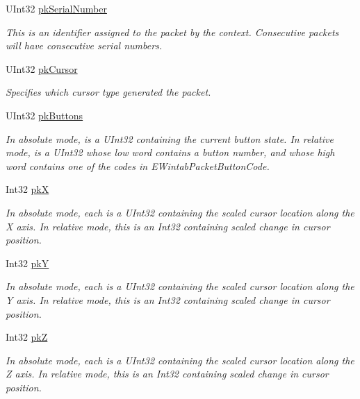 \begin{DoxyCompactItemize}
U\+Int32 \mbox{\hyperlink{struct_wintab_d_n_1_1_wintab_packet_acf152814269e76ecb7e957d9b46c2b68}{pk\+Serial\+Number}}
\begin{DoxyCompactList}\small\item\em This is an identifier assigned to the packet by the context. Consecutive packets will have consecutive serial numbers. \end{DoxyCompactList}\item 
U\+Int32 \mbox{\hyperlink{struct_wintab_d_n_1_1_wintab_packet_a1e426b5b92617ed4a6ad158a415f3c88}{pk\+Cursor}}
\begin{DoxyCompactList}\small\item\em Specifies which cursor type generated the packet. \end{DoxyCompactList}\item 
U\+Int32 \mbox{\hyperlink{struct_wintab_d_n_1_1_wintab_packet_af9d3fe5f03366ce26c3023b7b5ae5fcc}{pk\+Buttons}}
\begin{DoxyCompactList}\small\item\em In absolute mode, is a U\+Int32 containing the current button state. In relative mode, is a U\+Int32 whose low word contains a button number, and whose high word contains one of the codes in E\+Wintab\+Packet\+Button\+Code. \end{DoxyCompactList}\item 
Int32 \mbox{\hyperlink{struct_wintab_d_n_1_1_wintab_packet_abc78995c3ee22fc3203a0b78eb2ed771}{pkX}}
\begin{DoxyCompactList}\small\item\em In absolute mode, each is a U\+Int32 containing the scaled cursor location along the X axis. In relative mode, this is an Int32 containing scaled change in cursor position. \end{DoxyCompactList}\item 
Int32 \mbox{\hyperlink{struct_wintab_d_n_1_1_wintab_packet_a81cedb6973cd5298fe65d36f3e16d792}{pkY}}
\begin{DoxyCompactList}\small\item\em In absolute mode, each is a U\+Int32 containing the scaled cursor location along the Y axis. In relative mode, this is an Int32 containing scaled change in cursor position. \end{DoxyCompactList}\item 
Int32 \mbox{\hyperlink{struct_wintab_d_n_1_1_wintab_packet_a7bfc56cd0228a44c13579ffa53196ac1}{pkZ}}
\begin{DoxyCompactList}\small\item\em In absolute mode, each is a U\+Int32 containing the scaled cursor location along the Z axis. In relative mode, this is an Int32 containing scaled change in cursor position. \end{DoxyCompactList}\item 

\end{DoxyCompactItemize}
